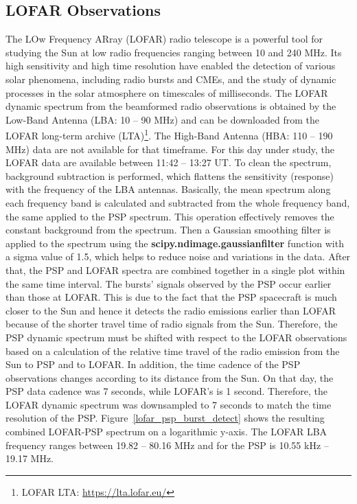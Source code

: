 \subsection{LOFAR Observations}
The LOw Frequency ARray (LOFAR) radio telescope \citep{lofar_2013} is a powerful tool for studying the Sun at low radio frequencies ranging between 10 and 240 MHz. Its high sensitivity and high time resolution have enabled the detection of various solar phenomena, including radio bursts and CMEs, and the study of dynamic processes in the solar atmosphere on timescales of milliseconds.
The LOFAR dynamic spectrum from the beamformed radio observations is obtained by the Low-Band Antenna (LBA: 10 – 90 MHz) and can be downloaded from the LOFAR long-term archive (LTA)\footnote{LOFAR LTA: \url{https://lta.lofar.eu/}}. The High-Band Antenna (HBA: 110 – 190 MHz) data are not available for that timeframe. For this day under study, the LOFAR data are available between 11:42 – 13:27 UT. To clean the spectrum, background subtraction is performed, which flattens the sensitivity (response) with the frequency of the LBA antennas. Basically, the mean spectrum along each frequency band is calculated and subtracted from the whole frequency band, the same applied to the PSP spectrum. This operation effectively removes the constant background from the spectrum. Then a Gaussian smoothing filter is applied to the spectrum using the \textbf{scipy.ndimage.gaussian\textunderscore filter} function with a sigma value of 1.5, which helps to reduce noise and variations in the data.
After that, the PSP and LOFAR spectra are combined together in a single plot within the same time interval. The bursts’ signals observed by the PSP occur earlier than those at LOFAR. This is due to the fact that the PSP spacecraft is much closer to the Sun and hence it detects the radio emissions earlier than LOFAR because of the shorter travel time of radio signals from the Sun. Therefore, the PSP dynamic spectrum must be shifted with respect to the LOFAR observations based on a calculation of the relative time travel of the radio emission from the Sun to PSP and to LOFAR. In addition, the time cadence of the PSP observations changes according to its distance from the Sun. On that day, the PSP data cadence was 7 seconds, while LOFAR’s is 1 second. Therefore, the LOFAR dynamic spectrum was downsampled to 7 seconds to match the time resolution of the PSP. Figure~\ref{lofar_psp_burst_detect} shows the resulting combined LOFAR-PSP spectrum on a logarithmic y-axis.
The LOFAR LBA frequency ranges between 19.82 -- 80.16 MHz and for the PSP is 10.55 kHz -- 19.17 MHz.

